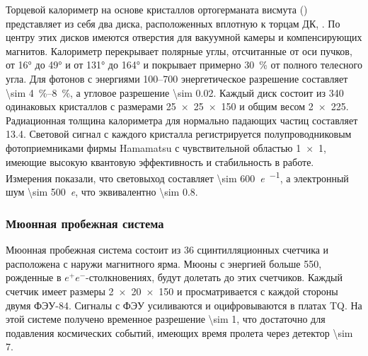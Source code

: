 Торцевой калориметр на основе кристаллов ортогерманата висмута  () представляет из себя два диска, расположенных вплотную к торцам ДК, \cite{BGOAkhmetshin2009}.
По центру этих дисков имеются отверстия для вакуумной камеры и компенсирующих магнитов.
Калориметр перекрывает полярные углы,
отсчитанные от оси пучков,
от \ang{16} до \ang{49} и от \ang{131} до \ang{164} и покрывает примерно \SI{30}{\percent} от полного телесного угла.
Для фотонов с энергиями 
\SIrange[range-phrase = --, range-units = single]{100}{700}{\MeVr}
энергетическое разрешение составляет 
\SIrange[range-phrase = --, range-units = single]{\sim 4}{8}{\percent},
а угловое разрешение \SI{\sim 0.02}{\radianru}.
Каждый диск состоит из \num{340} одинаковых кристаллов с размерами
\SI[product-units = power]{25 x 25 x 150}{\mmr}
и общим весом
\SI[product-units = single]{2 x 225}{\kgr}. 
Радиационная толщина калориметра для нормально падающих частиц составляет \SI{13.4}{\Xrad}.
Световой сигнал с каждого кристалла регистрируется полупроводниковым фотоприемниками фирмы Hamamatsu с чувствительной областью \SI[product-units = power]{1 x 1}{\cmr},
имеющие высокую квантовую эффективность и стабильность в работе. 
Измерения показали,
что световыход составляет \SI{\sim 600}{\elementarycharge\per\MeVr},
а электронный шум \SI{\sim 500}{\elementarycharge},
что эквивалентно \SI{\sim 0.8}{\MeVr}. 




\subsubsection{Мюонная пробежная система}
\label{sec:mu}

Мюонная пробежная система состоит из \num{36} сцинтилляционных счетчика и расположена с наружи магнитного ярма.
Мюоны с энергией больше \SI{550}{\MeVr},
рожденные в $e^+e^-$-столкновениях,
будут долетать до этих счетчиков. 
Каждый счетчик имеет размеры \SI[product-units = power]{2 x 20 x 150}{\cmr} и просматривается с каждой стороны двумя ФЭУ-84.
Сигналы с ФЭУ усиливаются и оцифровываются в платах TQ. 
На этой системе получено временное разрешение \SI{\sim 1}{\nsr}, что достаточно для подавления космических событий, имеющих время пролета через детектор \SI{\sim 7}{\nsr}.



